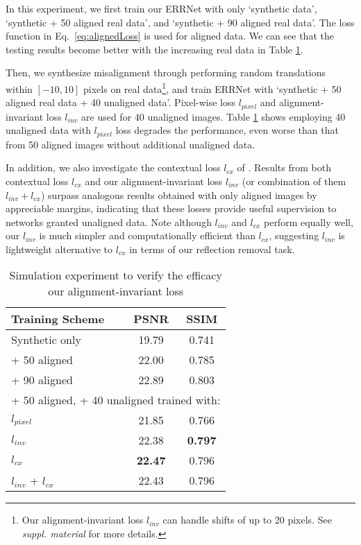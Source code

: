\documentclass[10pt,twocolumn,letterpaper]{article}
\begin{document}
\vspace{5pt}
In this experiment, we first train our ERRNet with only `synthetic data', `synthetic + 50
aligned real data', and `synthetic + 90 aligned real data'. The loss
function in Eq.~\eqref{eq:alignedLoss} is used for aligned data. We can
see that the testing results become better with the increasing real data in
Table \ref{tb:unalignedLoss}. 

Then, we synthesize misalignment through
performing random translations within $[-10, 10]$ pixels on real data\footnote{Our alignment-invariant loss $l_{inv}$ can handle shifts of up to 20 pixels.  See \textit{suppl. material} for more details.}, and train
ERRNet with `synthetic + 50 aligned real data + 40 unaligned data'. Pixel-wise loss
$l_{pixel}$ and alignment-invariant
loss $l_{inv}$ are used for 40 unaligned
images. Table \ref{tb:unalignedLoss} shows employing 40 unaligned data with
$l_{pixel}$ loss degrades the performance, even worse than that from 50 aligned
images without additional unaligned data.


In addition, we also investigate the contextual loss $l_{cx}$ of
\cite{Mechrez_2018_ECCV}.  Results from both contextual loss $l_{cx}$ and our alignment-invariant loss
$l_{inv}$ (or combination of them $l_{inv} + l_{cx}$) surpass analogous results obtained with only aligned images by appreciable margins, indicating that these losses provide useful supervision
to networks granted unaligned data. Note although $l_{inv}$ and $l_{cx}$ perform 
equally well, our $l_{inv}$ is much simpler and computationally efficient than
$l_{cx}$, suggesting $l_{inv}$ is lightweight alternative to $l_{cx}$ in terms of
our reflection removal task.

\begin{table}[t]
\centering
\caption{Simulation experiment to verify the efficacy our alignment-invariant loss}
\footnotesize
\begin{tabular}{lcc} 
		\toprule
		Training Scheme & PSNR & SSIM  \\ 
		\midrule
		Synthetic only & 19.79 & 0.741 \\ \hline
		+ 50 aligned & 22.00 &  0.785 \\ \hline		
		+ 90 aligned & 22.89 & 0.803 \\ \hline		
		\midrule
		\multicolumn{3}{c}{+ 50 aligned, + 40 unaligned trained with:} \vspace{3pt}\\
$l_{pixel}$ & 21.85 &  0.766 \\ \hline
		$l_{inv} $ & 22.38 & \textbf{0.797}   \\ \hline		
		$l_{cx}$ & \textbf{22.47} &  0.796 \\ \hline		
		$l_{inv} $ + $l_{cx}$ & 22.43 & 0.796 \\ \hline
\bottomrule
\end{tabular}
\label{tb:unalignedLoss}
\end{table}
\end{document}
